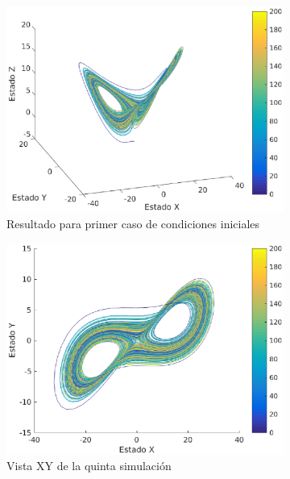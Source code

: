 \documentclass[12pt,letterpaper]{article}
\begin{document}
\begin{figure}
	\centering
	\begin{subfigure}[t]{0.36\textwidth}
		\includegraphics[width=\textwidth]{pictures/quinta_simulacion}
		\caption{Resultado para primer caso de condiciones iniciales}
		\label{fig:simulacion5}
	\end{subfigure}
	\begin{subfigure}[t]{0.36\textwidth}
		\includegraphics[width=\textwidth]{pictures/quinta_simulacion_xy}
		\caption{Vista XY de la quinta simulación}
		\label{fig:simulacion5xy}
	\end{subfigure}
        \vfill
        \begin{subfigure}[b]{0.36\textwidth}

\end{subfigure}
\end{figure}
\end{document}
